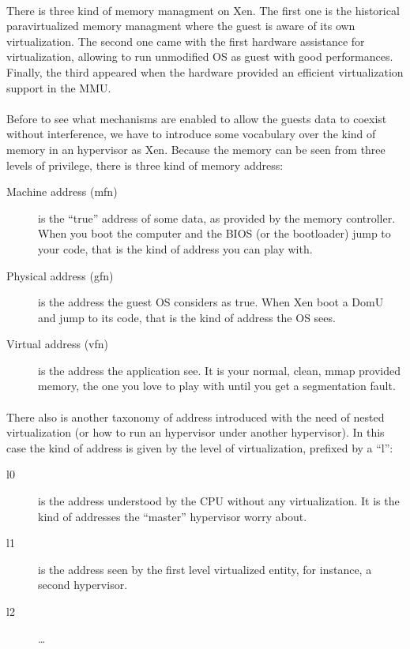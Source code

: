 \label{memory/main}

\paragraph{}
There is three kind of memory managment on Xen.
The first one is the historical paravirtualized memory managment where the
guest is aware of its own virtualization.
The second one came with the first hardware assistance for virtualization,
allowing to run unmodified OS as guest with good performances.
Finally, the third appeared when the hardware provided an efficient
virtualization support in the MMU.

\paragraph{}
Before to see what mechanisms are enabled to allow the guests data to coexist
without interference, we have to introduce some vocabulary over the kind of
memory in an hypervisor as Xen.
Because the memory can be seen from three levels of privilege, there is three
kind of memory address:
\begin{description}
\item[Machine address (mfn)] is the ``true'' address of some data, as provided
  by the memory controller.
  When you boot the computer and the BIOS (or the bootloader) jump to your
  code, that is the kind of address you can play with.
\item[Physical address (gfn)] is the address the guest OS considers as true.
  When Xen boot a DomU and jump to its code, that is the kind of address the
  OS sees.
\item[Virtual address (vfn)] is the address the application see.
  It is your normal, clean, mmap provided memory, the one you love to play
  with until you get a segmentation fault.
\end{description}

\paragraph{}
There also is another taxonomy of address introduced with the need of nested
virtualization (or how to run an hypervisor under another hypervisor).
In this case the kind of address is given by the level of virtualization,
prefixed by a ``l'':
\begin{description}
\item[l0] is the address understood by the CPU without any virtualization.
  It is the kind of addresses the ``master'' hypervisor worry about.
\item[l1] is the address seen by the first level virtualized entity, for
  instance, a second hypervisor.
\item[l2] \ldots
\end{description}


